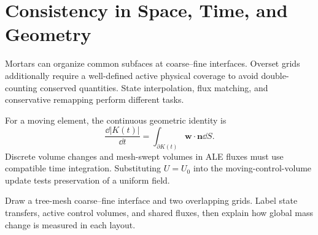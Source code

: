 \section{Consistency in Space, Time, and Geometry}
Mortars can organize common subfaces at coarse--fine interfaces. Overset grids additionally require a well-defined active physical coverage
to avoid double-counting conserved quantities. State interpolation, flux matching, and conservative remapping perform different tasks.

For a moving element, the continuous geometric identity is
\[
\frac{\dd |K(t)|}{\dd t}
=\int_{\partial K(t)}\bm w\cdot\bm n\dd S.
\]
Discrete volume changes and mesh-swept volumes in ALE fluxes must use compatible time integration.
Substituting $U=U_0$ into the moving-control-volume update tests preservation of a uniform field.

{Draw a tree-mesh coarse--fine interface and two overlapping grids. Label state transfers, active control volumes, and shared fluxes, then explain how global mass change is measured in each layout.}
